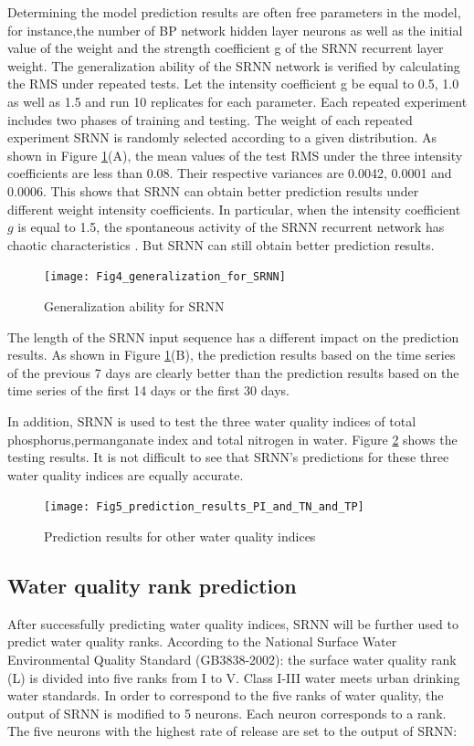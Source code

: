 \documentclass[runningheads]{llncs}
\begin{document}
Determining the model prediction results are often free parameters in the model, 
for instance,the number of BP network hidden layer neurons as well as the initial
value of the weight and the strength coefficient g of the SRNN recurrent 
layer weight. The generalization ability of the SRNN network is verified
by calculating the RMS under repeated tests. 
Let the intensity coefficient g be equal to 0.5, 1.0 as well as 1.5 and run 10 
replicates for each parameter. Each repeated experiment includes two
phases of training and testing. The weight of each repeated experiment 
SRNN is randomly selected according to a given distribution. 
As shown in Figure \ref{Generalization ability for SRNN}(A), the mean values of the test
RMS under the three intensity coefficients are less 
than 0.08. Their respective variances are 0.0042, 0.0001 and 0.0006. This 
shows that SRNN can obtain better prediction results under different weight
intensity coefficients. In particular, when the intensity coefficient
$g$ is equal to 1.5, the spontaneous activity of the SRNN recurrent network has
chaotic characteristics \cite{RN17}. But SRNN can still obtain better prediction results.

\begin{figure}[htbp]
\centering
\texttt{[image: Fig4\_generalization\_for\_SRNN]}
\caption{Generalization ability for SRNN}
\label{Generalization ability for SRNN}
\end{figure}

The length of the SRNN input sequence has a different impact on the prediction results. 
As shown in Figure \ref{Generalization ability for SRNN}(B), the prediction 
results based on the time series of the 
previous 7 days are clearly better than the prediction results 
based on the time series of the first 14 days or the first 30 days.

In addition, SRNN is used to test the three water quality indices of 
total phosphorus,permanganate index  and total nitrogen in water. 
Figure \ref{Prediction results for other water quality indices} shows the testing results. 
It is not difficult to see that 
SRNN's predictions for these three water quality indices are equally accurate.
\begin{figure}[htbp]
\centering
\texttt{[image: Fig5\_prediction\_results\_PI\_and\_TN\_and\_TP]}
\caption{Prediction results for other water quality indices}
\label{Prediction results for other water quality indices}
\end{figure}

\subsection{Water quality rank prediction}
After successfully predicting water quality indices, 
SRNN will be further used to predict water quality ranks. 
According to the National Surface Water Environmental Quality Standard (GB3838-2002): 
the surface water quality rank (L) is divided into 
five ranks from I to V. Class I-III water meets urban drinking water standards. 
In order to correspond to the five ranks of water quality, the output of 
SRNN is modified to 5 neurons. Each neuron corresponds to a rank. 
The five neurons with the highest rate of release are set to the output of SRNN:
\end{document}

